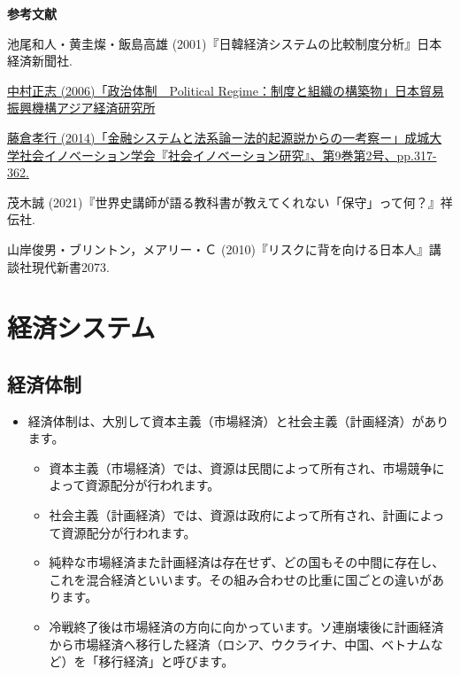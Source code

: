 \documentclass[
]{book}
\begin{document}
{\textbf{参考文献}}

池尾和人・黄圭燦・飯島高雄 (2001)『日韓経済システムの比較制度分析』日本経済新聞社.

\href{https://www.ide.go.jp/Japanese/Research/Theme/Pol/Institutions/200608_nakamura.html}{中村正志 (2006)「政治体制　Political Regime：制度と組織の構築物」日本貿易振興機構アジア経済研究所}

\href{https://seijo.repo.nii.ac.jp/?action=repository_uri\&item_id=3623\&file_id=22\&file_no=1}{藤倉孝行 (2014)「金融システムと法系論ー法的起源説からの一考察ー」成城大学社会イノベーション学会『社会イノベーション研究』、第9巻第2号、pp.317-362.}

茂木誠 (2021)『世界史講師が語る教科書が教えてくれない「保守」って何？』祥伝社.

山岸俊男・ブリントン，メアリー・Ｃ (2010)『リスクに背を向ける日本人』講談社現代新書2073.

\hypertarget{economy}{%
\section{経済システム}\label{economy}}

\hypertarget{economic_regime}{%
\subsection{経済体制}\label{economic_regime}}

\begin{itemize}
\item
  経済体制は、大別して資本主義（市場経済）と社会主義（計画経済）があります。

  \begin{itemize}
  \item
    資本主義（市場経済）では、資源は民間によって所有され、市場競争によって資源配分が行われます。
  \item
    社会主義（計画経済）では、資源は政府によって所有され、計画によって資源配分が行われます。
  \item
    純粋な市場経済また計画経済は存在せず、どの国もその中間に存在し、これを混合経済といいます。その組み合わせの比重に国ごとの違いがあります。
  \item
    冷戦終了後は市場経済の方向に向かっています。ソ連崩壊後に計画経済から市場経済へ移行した経済（ロシア、ウクライナ、中国、ベトナムなど）を「移行経済」と呼びます。
  \end{itemize}
\end{itemize}
\end{document}
